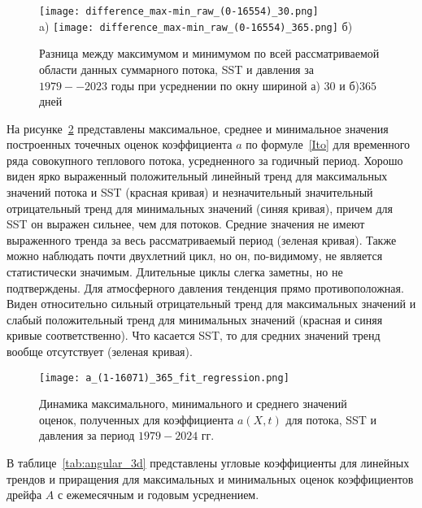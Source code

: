 \begin{figure}
	\centering
	\texttt{[image: difference\_max-min\_raw\_(0-16554)\_30.png]}\\
	a)
	\texttt{[image: difference\_max-min\_raw\_(0-16554)\_365.png]}
	б)
	\caption{Разница между максимумом и минимумом по всей рассматриваемой области данных суммарного потока, SST и давления за $1979--2023$ годы при усреднении по окну шириной а) $30$ и б)$365$ дней}
	\label{fig:raw_trends}
\end{figure}

На рисунке~\ref{fig:a_extreme_365} представлены максимальное, среднее и минимальное значения построенных точечных оценок коэффициента $a$ по формуле~\eqref{Ito} для временного ряда совокупного теплового потока, усредненного за годичный период. Хорошо виден ярко выраженный положительный линейный тренд для максимальных значений потока и SST (красная кривая) и незначительный значительный отрицательный тренд для минимальных значений (синяя кривая), причем для SST он выражен сильнее, чем для потоков. Средние значения не имеют выраженного тренда за весь рассматриваемый период (зеленая кривая). Также можно наблюдать почти двухлетний цикл, но он, по-видимому, не является статистически значимым. Длительные циклы слегка заметны, но не подтверждены. Для атмосферного давления тенденция прямо противоположная. Виден относительно сильный отрицательный тренд для максимальных значений и слабый положительный тренд для минимальных значений (красная и синяя кривые соответственно). Что касается SST, то для средних значений тренд вообще отсутствует (зеленая кривая).


\begin{figure}
	\centering
	\texttt{[image: a\_(1-16071)\_365\_fit\_regression.png]}
	\caption{Динамика максимального, минимального и среднего значений оценок, полученных для коэффициента $a(X,t)$ для потока, SST и давления за период $1979-2024$ гг.} 
	\label{fig:a_extreme_365}
\end{figure}

В таблице~\ref{tab:angular_3d} представлены угловые коэффициенты для линейных трендов и приращения для максимальных и минимальных оценок коэффициентов дрейфа $A$ с ежемесячным и годовым усреднением.

